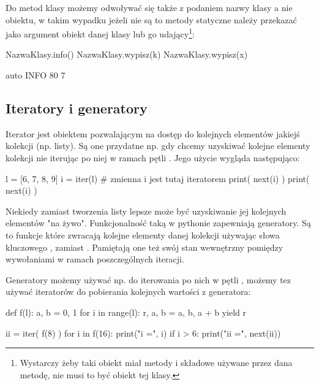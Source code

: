 \documentclass{pdfBooklets}
\begin{document}
Do metod klasy możemy odwoływać się także z podaniem nazwy klasy a nie obiektu, w takim wypadku jeżeli nie są to metody statyczne należy przekazać jako argument obiekt danej klasy
lub go udający\footnote{
Wystarczy żeby taki obiekt miał metody i składowe używane przez dana metodę, nie musi to być obiekt tej klasy.
}:

\begin{CodeFrame}[python]{0.55\textwidth}
NazwaKlasy.info()
NazwaKlasy.wypisz(k)
NazwaKlasy.wypisz(x)
\end{CodeFrame}
\begin{CodeFrame}{auto}
INFO
80
7
\end{CodeFrame}

\vspace{-13pt}

\subsection{Iteratory i generatory {\Symbola 🤔}}

Iterator jest obiektem pozwalającym na dostęp do kolejnych elementów jakiejś kolekcji (np. listy).
Są one przydatne np. gdy chcemy uzyskiwać kolejne elementy kolekcji nie iterując po niej w ramach pętli .
Jego użycie wygląda następująco:

\begin{CodeFrame*}[python]{}
l = [6, 7, 8, 9]
i = iter(l)  # zmienna i jest tutaj iteratorem
print( next(i) )
print( next(i) )
\end{CodeFrame*}

Niekiedy zamiast tworzenia listy lepsze może być uzyskiwanie jej kolejnych elementów "na żywo".
Funkcjonalność taką w pythonie zapewniają generatory.
Są to funkcje które zwracają kolejne elementy danej kolekcji używając słowa kluczowego , zamiast .
Pamiętają one też swój stan wewnętrzny pomiędzy wywołaniami w ramach poszczególnych iteracji.

Generatory możemy używać np. do iterowania po nich w pętli ,
możemy tez używać iteratorów do pobierania kolejnych wartości z generatora:

\begin{CodeFrame*}[python]{}
def f(l):
    a, b = 0, 1
    for i in range(l):
        r, a, b = a, b, a + b
        yield r

ii = iter( f(8) )
for i in f(16):
    print("i =", i)
    if i > 6:
        print("ii =", next(ii))
\end{CodeFrame*}
\end{document}

